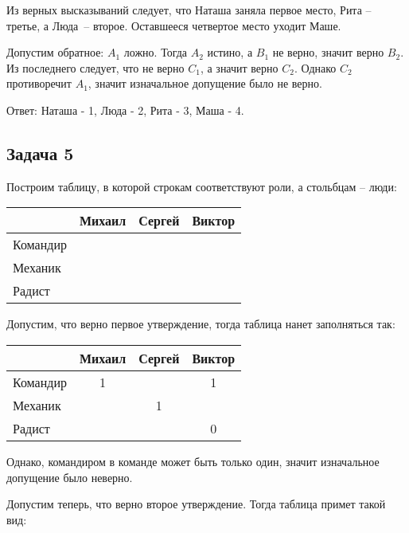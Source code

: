 \documentclass[12pt, a4paper]{article}
\begin{document}
  Из верных высказываний следует, что Наташа заняла первое место, Рита -- третье,
  а Люда~-- второе. Оставшееся четвертое место уходит Маше.

  Допустим обратное: $ A_1 $ ложно. Тогда $ A_2 $ истино, а $ B_1 $ не верно, значит
  верно $ B_2 $. Из последнего следует, что не верно $ C_1 $, а значит верно $ C_2 $.
  Однако $ C_2 $ противоречит $ A_1 $, значит изначальное допущение было не верно.

  Ответ: Наташа - 1, Люда - 2, Рита - 3, Маша - 4.

  \subsection{Задача 5}
  Построим таблицу, в которой строкам соответствуют роли, а стольбцам -- люди:

  \rule{0cm}{0.3cm}

  \begin{tabular}{|l|c|c|c|}
    \hline
             & Михаил & Сергей & Виктор \\ \hline
    Командир &        &        &        \\ \hline
    Механик  &        &        &        \\ \hline
    Радист   &        &        &        \\ \hline
  \end{tabular}

  \rule{0cm}{0.3cm}


  Допустим, что верно первое утверждение, тогда таблица нанет заполняться так:

  \rule{0cm}{0.3cm}

  \begin{tabular}{|l|c|c|c|}
    \hline
             & Михаил & Сергей & Виктор \\ \hline
    Командир & 1      &        & 1      \\ \hline
    Механик  &        & 1      &        \\ \hline
    Радист   &        &        & 0      \\ \hline
  \end{tabular}

  \rule{0cm}{0.3cm}

  Однако, командиром в команде может быть только один, значит изначальное допущение было неверно.

  Допустим теперь, что верно второе утверждение. Тогда таблица примет такой вид:

  \rule{0cm}{0.3cm}
\end{document}
